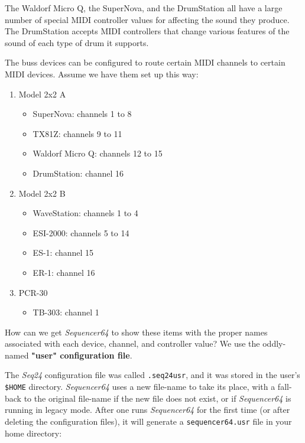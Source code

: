    The Waldorf Micro Q, the SuperNova, and the DrumStation all have a large
   number of special MIDI controller values for affecting the sound they
   produce.  The DrumStation accepts MIDI controllers that change various
   features of the sound of each type of drum it supports.

   The buss devices can be configured to route certain
   MIDI channels to certain MIDI devices.  Assume we have them
   set up this way:

   \begin{enumerate}
      \item Model 2x2 A
      \begin{itemize}
         \item SuperNova: channels 1 to 8
         \item TX81Z: channels 9 to 11
         \item Waldorf Micro Q: channels 12 to 15
         \item DrumStation: channel 16
      \end{itemize}
      \item Model 2x2 B
      \begin{itemize}
         \item WaveStation: channels 1 to 4
         \item ESI-2000: channels 5 to 14
         \item ES-1: channel 15
         \item ER-1: channel 16
      \end{itemize}
      \item PCR-30
      \begin{itemize}
         \item TB-303: channel 1
      \end{itemize}
   \end{enumerate}

   How can we get \textsl{Sequencer64} to show these items with the proper
   names associated with each device, channel, and controller value?
   We use the oddly-named \textbf{"user" configuration file}.

   The \textsl{Seq24} configuration file was called
   \texttt{.seq24usr}, and it was stored in the user's \texttt{\$HOME}
   directory.
   \textsl{Sequencer64} uses a new file-name
   to take its place, with a fall-back to the original file-name if the new
   file does not exist, or if \textsl{Sequencer64} is running in
   legacy mode.
   After one runs \textsl{Sequencer64} for the first time (or after deleting
   the configuration files), it will generate a
   \texttt{sequencer64.usr} file in your home directory:

